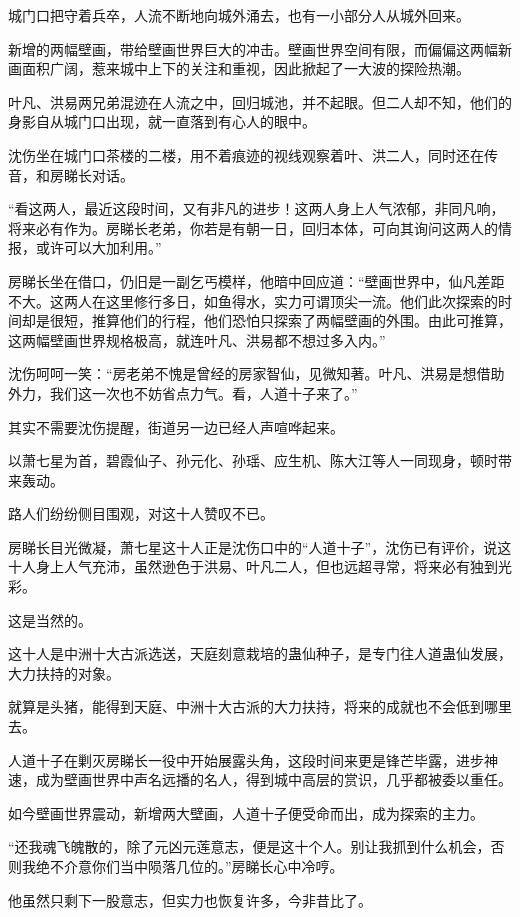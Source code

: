 \begin{this_body}
城门口把守着兵卒，人流不断地向城外涌去，也有一小部分人从城外回来。

新增的两幅壁画，带给壁画世界巨大的冲击。壁画世界空间有限，而偏偏这两幅新画面积广阔，惹来城中上下的关注和重视，因此掀起了一大波的探险热潮。

叶凡、洪易两兄弟混迹在人流之中，回归城池，并不起眼。但二人却不知，他们的身影自从城门口出现，就一直落到有心人的眼中。

沈伤坐在城门口茶楼的二楼，用不着痕迹的视线观察着叶、洪二人，同时还在传音，和房睇长对话。

“看这两人，最近这段时间，又有非凡的进步！这两人身上人气浓郁，非同凡响，将来必有作为。房睇长老弟，你若是有朝一日，回归本体，可向其询问这两人的情报，或许可以大加利用。”

房睇长坐在借口，仍旧是一副乞丐模样，他暗中回应道：“壁画世界中，仙凡差距不大。这两人在这里修行多日，如鱼得水，实力可谓顶尖一流。他们此次探索的时间却是很短，推算他们的行程，他们恐怕只探索了两幅壁画的外围。由此可推算，这两幅壁画世界规格极高，就连叶凡、洪易都不想过多入内。”

沈伤呵呵一笑：“房老弟不愧是曾经的房家智仙，见微知著。叶凡、洪易是想借助外力，我们这一次也不妨省点力气。看，人道十子来了。”

其实不需要沈伤提醒，街道另一边已经人声喧哗起来。

以萧七星为首，碧霞仙子、孙元化、孙瑶、应生机、陈大江等人一同现身，顿时带来轰动。

路人们纷纷侧目围观，对这十人赞叹不已。

房睇长目光微凝，萧七星这十人正是沈伤口中的“人道十子”，沈伤已有评价，说这十人身上人气充沛，虽然逊色于洪易、叶凡二人，但也远超寻常，将来必有独到光彩。

这是当然的。

这十人是中洲十大古派选送，天庭刻意栽培的蛊仙种子，是专门往人道蛊仙发展，大力扶持的对象。

就算是头猪，能得到天庭、中洲十大古派的大力扶持，将来的成就也不会低到哪里去。

人道十子在剿灭房睇长一役中开始展露头角，这段时间来更是锋芒毕露，进步神速，成为壁画世界中声名远播的名人，得到城中高层的赏识，几乎都被委以重任。

如今壁画世界震动，新增两大壁画，人道十子便受命而出，成为探索的主力。

“还我魂飞魄散的，除了元凶元莲意志，便是这十个人。别让我抓到什么机会，否则我绝不介意你们当中陨落几位的。”房睇长心中冷哼。

他虽然只剩下一股意志，但实力也恢复许多，今非昔比了。


\end{this_body}
